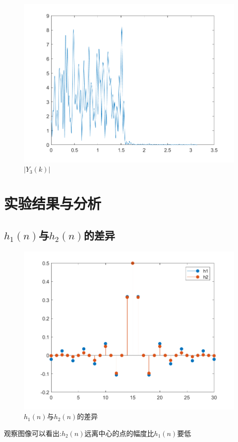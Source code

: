 \documentclass{../source/zjureport}
\begin{document}
\begin{figure}[H]
\begin{minipage}[H]{0.32\textwidth}
                    \centering
                    \includegraphics[width=\textwidth]{figure/Y3(k).png}
                    \caption{$|Y_3(k)|$}
                \end{minipage}
            \end{figure}

    \section{实验结果与分析}
        \subsection{$h_1(n)$与$h_2(n)$的差异}
            \begin{figure}[H]
                \centering
                \includegraphics[scale = 0.7]{figure/h区别.png}
                \caption{$h_1(n)$与$h_2(n)$的差异}
            \end{figure}
        观察图像可以看出:$h_2(n)$远离中心的点的幅度比$h_1(n)$要低
\end{document}
